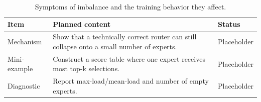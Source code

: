 \begin{table}[H]
\centering
\caption{Symptoms of imbalance and the training behavior they affect.}
\label{tab:ch07-expert-imbalance-as-a-training-problem}
\begin{tabularx}{\textwidth}{p{}X p{}}
\toprule
Item & Planned content & Status \\
\midrule
Mechanism & Show that a technically correct router can still collapse onto a small number of experts. & Placeholder \\
Mini-example & Construct a score table where one expert receives most top-k selections. & Placeholder \\
Diagnostic & Report max-load/mean-load and number of empty experts. & Placeholder \\
\bottomrule
\end{tabularx}
\end{table}
